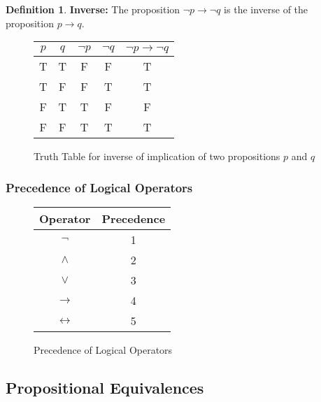 \documentclass[article, 11pt]{article}
\theoremstyle{definition}
\newtheorem{definition}{Definition}[subsubsection]
\newcommand{\lra}{\leftrightarrow} %
\begin{document}
    \begin{definition}
        \textbf{Inverse:} The proposition $\neg p \to \neg q$ is the inverse of the proposition $p \to q$.    
    \end{definition}
    \begin{figure}[H]
        \centering
            \begin{tabular}{c|c|c|c|c}
                $p$ & $q$ & $\neg{p}$ & $\neg{q}$ & $\neg p \to \neg q$ \\
                \hline
                T & T & F & F & T \\
                T & F & F & T & T \\
                F & T & T & F & F \\
                F & F & T & T & T
            \end{tabular}    
        \caption{Truth Table for inverse of implication of two propositions $p$ and $q$}
    \end{figure}
    \subsubsection{Precedence of Logical Operators}
    \begin{figure}[H]
        \centering
        \begin{tabular}{|c|c|}
            \hline
            Operator & Precedence \\
            \hline
            $\neg$ & 1 \\
            $\land$ & 2 \\
            $\lor$ & 3 \\
            $\to$ & 4 \\
            $\lra$ & 5 \\
            \hline        
        \end{tabular}
        \caption{Precedence of Logical Operators}
    \end{figure}
    \subsection{Propositional Equivalences}
\end{document}
